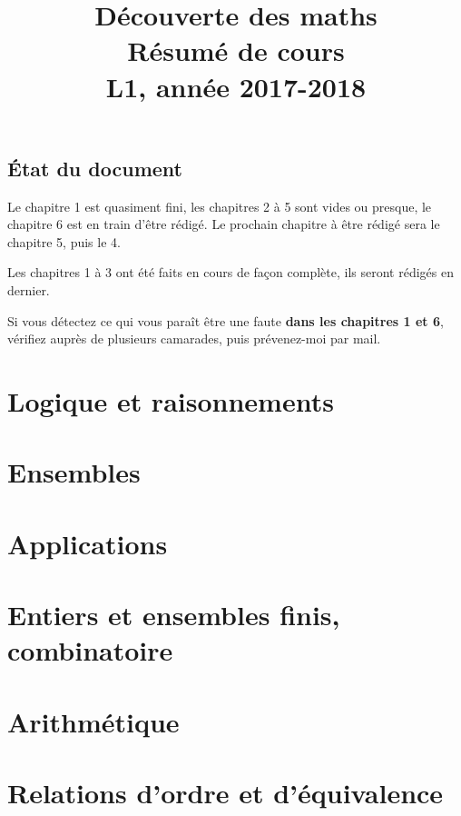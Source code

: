 \documentclass[10pt,a4paper]{book}
\theoremstyle{definition}
\begin{document}
\title{Découverte des maths\\
Résumé de cours\\
L1, année 2017-2018}
\maketitle
\section{\'Etat du document}

Le chapitre 1 est quasiment fini, les chapitres 2 à 5 sont vides ou presque, le chapitre 6 est en train d'être rédigé. Le prochain chapitre à être rédigé sera le chapitre 5, puis le 4.


Les chapitres 1 à 3 ont été faits en cours de façon complète, ils seront rédigés en dernier.

Si vous détectez ce qui vous paraît être une faute \textbf{dans les chapitres 1 et 6}, vérifiez auprès de plusieurs camarades, puis prévenez-moi par mail.



\tableofcontents





\chapter{Logique et raisonnements}


\chapter{Ensembles}


\chapter{Applications}


\chapter{Entiers et ensembles finis, combinatoire}


\chapter{Arithmétique}


\chapter{Relations d'ordre et d'équivalence}

\end{document}
